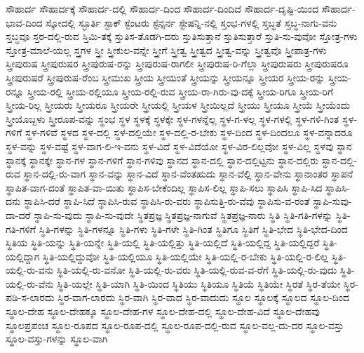 {ಸೌಹಾರ್ದ
ಸೌಹಾರ್ದಕ್ಕೆ
ಸೌಹಾರ್ದ-ದಲ್ಲಿ
ಸೌಹಾರ್ದ-ದಿಂದ
ಸೌಹಾರ್ದ-ದಿಂದಿದೆ
ಸೌಹಾರ್ದ-ದೃಷ್ಟಿ-ಯಿಂದ
ಸೌಹಾರ್ದ-ಭಾವ-ದಿಂದ
ಸ್ಕೋದಲ್ಲಿ
ಸ್ಛೂರ್ತಿ
ಸ್ಟಾಕ್
ಸ್ಟೆಂಟರು
ಸ್ಟೆನ್ಸರ್ನ
ಸ್ಟೇಷನ್ನಿ-ನಲ್ಲಿ
ಸ್ತಂಭ-ಗಳಲ್ಲಿ
ಸ್ತಬ್ಧತೆ
ಸ್ತಬ್ಧ-ನಾಗು-ವನು
ಸ್ತಬ್ಧವೂ
ಸ್ತರ-ದಲ್ಲಿ-ರುವ
ಸ್ತಿಮಿ-ತಕ್ಕೆ
ಸ್ತುತಿಸ-ತೊಡಗಿ-ದರು
ಸ್ತುತಿಸುತ್ತಾನೆ
ಸ್ತುತಿಸುತ್ತಾರೆ
ಸ್ತುತಿ-ಸು-ವುವೋ
ಸ್ತೋತ್ರ-ಗಳು
ಸ್ತೋತ್ರ-ಮಾಲೆ-ಯಲ್ಲ
ಸ್ತ್ರಗಳ
ಸ್ತ್ರೀ
ಸ್ತ್ರೀಕುಲ-ವನ್ನೇ
ಸ್ತ್ರೀಗೆ
ಸ್ತ್ರೀತ್ವ
ಸ್ತ್ರೀತ್ವದ
ಸ್ತ್ರೀತ್ವ-ವನ್ನು
ಸ್ತ್ರೀತ್ವವೊ
ಸ್ತ್ರೀಪಾತ್ರ-ಗಳು
ಸ್ತ್ರೀಪುರುಷ
ಸ್ತ್ರೀಪುರುಷರ
ಸ್ತ್ರೀಪುರುಷ-ರನ್ನು
ಸ್ತ್ರೀಪುರುಷ-ರಾಗಲೀ
ಸ್ತ್ರೀಪುರುಷ-ರಿ-ಗೆಲ್ಲಾ
ಸ್ತ್ರೀಪುರುಷರು
ಸ್ತ್ರೀಪುರುಷರೂ
ಸ್ತ್ರೀಪುರುಷರೆ
ಸ್ತ್ರೀಪುರುಷ-ರೆಂಬ
ಸ್ತ್ರೀಮುಖ
ಸ್ತ್ರೀಯ
ಸ್ತ್ರೀಯಂತೆ
ಸ್ತ್ರೀಯನ್ನು
ಸ್ತ್ರೀಯನ್ನೂ
ಸ್ತ್ರೀಯರ
ಸ್ತ್ರೀಯ-ರನ್ನು
ಸ್ತ್ರೀಯ-ರನ್ನೂ
ಸ್ತ್ರೀಯ-ರಲ್ಲಿ
ಸ್ತ್ರೀಯ-ರಲ್ಲಿಯೂ
ಸ್ತ್ರೀಯ-ರಲ್ಲಿ-ರುವ
ಸ್ತ್ರೀಯ-ರಾ-ಗಿರು-ವು-ದಕ್ಕೆ
ಸ್ತ್ರೀಯ-ರಿಗೂ
ಸ್ತ್ರೀಯ-ರಿಗೆ
ಸ್ತ್ರೀಯ-ರಿಲ್ಲ
ಸ್ತ್ರೀಯರು
ಸ್ತ್ರೀಯರೂ
ಸ್ತ್ರೀಯರೇ
ಸ್ತ್ರೀಯಲ್ಲಿ
ಸ್ತ್ರೀಯಳ
ಸ್ತ್ರೀಯಿಲ್ಲದೆ
ಸ್ತ್ರೀಯು
ಸ್ತ್ರೀಯೂ
ಸ್ತ್ರೀಯೆ
ಸ್ತ್ರೀಯೆಂದು
ಸ್ತ್ರೀಯೊಬ್ಬಳು
ಸ್ತ್ರೀರೂಪ-ವನ್ನು
ಸ್ಥಂಭ
ಸ್ಥಳ
ಸ್ಥಳಕ್ಕೆ
ಸ್ಥಳಕ್ಕೇ
ಸ್ಥಳ-ಗಳನ್ನೆಲ್ಲ
ಸ್ಥಳ-ಗ-ಳಲ್ಲ
ಸ್ಥಳ-ಗಳಲ್ಲಿ
ಸ್ಥಳ-ಗಳಿ-ಗಿಂತ
ಸ್ಥಳ-ಗಳಿಗೆ
ಸ್ಥಳ-ಗಳಿವೆ
ಸ್ಥಳದ
ಸ್ಥಳ-ದಲ್ಲಿ
ಸ್ಥಳ-ದಲ್ಲಿಯೇ
ಸ್ಥಳ-ದಲ್ಲಿ-ರ-ಬೇಕು
ಸ್ಥಳ-ದಿಂದ
ಸ್ಥಳ-ದಿಂದಲೂ
ಸ್ಥಳ-ವನ್ನಾದರೂ
ಸ್ಥಳ-ವನ್ನು
ಸ್ಥಳ-ವಷ್ಟೆ
ಸ್ಥಳ-ವಾಗ-ಲಿ-ಇ-ವನು
ಸ್ಥಳ-ವಿದೆ
ಸ್ಥಳ-ವಿದೆಯೋ
ಸ್ಥಳ-ವಿರ-ಲಿಲ್ಲವೋ
ಸ್ಥಳ-ವಿಲ್ಲ
ಸ್ಥಳವು
ಸ್ಥಾನ
ಸ್ಥಾನಕ್ಕೆ
ಸ್ಥಾನಕ್ಕೇ
ಸ್ಥಾನ-ಗಳ
ಸ್ಥಾನ-ಗಳಿಗೆ
ಸ್ಥಾನ-ಗಳಿವು
ಸ್ಥಾನದ
ಸ್ಥಾನ-ದಲ್ಲಿ
ಸ್ಥಾನ-ದಲ್ಲಿಟ್ಟನು
ಸ್ಥಾನ-ದಲ್ಲಿರು
ಸ್ಥಾನ-ದಲ್ಲಿ-ರುವ
ಸ್ಥಾನ-ದಲ್ಲಿ-ರು-ವಾಗ
ಸ್ಥಾನ-ವನ್ನು
ಸ್ಥಾನ-ವಿದೆ
ಸ್ಥಾನ-ವೆಂತಹುದು
ಸ್ಥಾನ-ವೆಲ್ಲಿ
ಸ್ಥಾನ-ವೇನು
ಸ್ಥಾನಾಂತರ
ಸ್ಥಾಪನೆ
ಸ್ಥಾಪಿತ-ವಾಗ-ದಂತೆ
ಸ್ಥಾಪಿತ-ವಾ-ಯಿತು
ಸ್ಥಾಪಿಸ-ಬೇಕೆಂದಿಲ್ಲ
ಸ್ಥಾಪಿಸ-ಲಿಲ್ಲ
ಸ್ಥಾಪಿ-ಸಲು
ಸ್ಥಾಪಿಸಿ
ಸ್ಥಾಪಿ-ಸಿದ
ಸ್ಥಾಪಿಸಿ-ದನು
ಸ್ಥಾಪಿಸಿ-ದರೆ
ಸ್ಥಾಪಿ-ಸಿದೆ
ಸ್ಥಾಪಿಸಿ-ರುವ
ಸ್ಥಾಪಿಸಿ-ರು-ವರು
ಸ್ಥಾಪಿಸುತ್ತಿ-ರು-ವೆವು
ಸ್ಥಾಪಿಸು-ವ-ರಂತೆ
ಸ್ಥಾಪಿ-ಸುವು-ದಾ-ದರೆ
ಸ್ಥಾಪಿ-ಸು-ವುದು
ಸ್ಥಾಪಿ-ಸು-ವುದೇ
ಸ್ಥಿತಪ್ರಜ್ಞ
ಸ್ಥಿತಪ್ರಜ್ಞ-ನಾಗುವೆ
ಸ್ಥಿತಪ್ರಜ್ಞ-ನಾರು
ಸ್ಥಿತಿ
ಸ್ಥಿತಿ-ಗತಿ-ಗಳನ್ನು
ಸ್ಥಿತಿ-ಗತಿ-ಗಳಿಗೆ
ಸ್ಥಿತಿ-ಗಳನ್ನು
ಸ್ಥಿತಿ-ಗಳನ್ನೂ
ಸ್ಥಿತಿ-ಗಳು
ಸ್ಥಿತಿ-ಗಳೇ
ಸ್ಥಿತಿ-ಗಿಂತ
ಸ್ಥಿತಿಗೂ
ಸ್ಥಿತಿಗೆ
ಸ್ಥಿತಿ-ಭೇದ
ಸ್ಥಿತಿ-ಭೇದ-ದಿಂದ
ಸ್ಥಿತಿಯ
ಸ್ಥಿತಿ-ಯನ್ನು
ಸ್ಥಿತಿ-ಯನ್ನೇ
ಸ್ಥಿತಿ-ಯಲ್ಲಿ
ಸ್ಥಿತಿ-ಯಲ್ಲಿತ್ತು
ಸ್ಥಿತಿ-ಯಲ್ಲಿದೆ
ಸ್ಥಿತಿ-ಯಲ್ಲಿದ್ದ
ಸ್ಥಿತಿ-ಯಲ್ಲಿದ್ದರೆ
ಸ್ಥಿತಿ-ಯಲ್ಲಿದ್ದಾಗ
ಸ್ಥಿತಿ-ಯಲ್ಲಿದ್ದುವೋ
ಸ್ಥಿತಿ-ಯಲ್ಲಿಯೂ
ಸ್ಥಿತಿ-ಯಲ್ಲಿಯೇ
ಸ್ಥಿತಿ-ಯಲ್ಲಿ-ರ-ಬೇಕು
ಸ್ಥಿತಿ-ಯಲ್ಲಿ-ರ-ಲಿಲ್ಲ
ಸ್ಥಿತಿ-ಯಲ್ಲಿ-ರು-ವನು
ಸ್ಥಿತಿ-ಯಲ್ಲಿ-ರು-ವನೋ
ಸ್ಥಿತಿ-ಯಲ್ಲಿ-ರು-ವರು
ಸ್ಥಿತಿ-ಯಲ್ಲಿ-ರುವ-ವ-ರೆಗೆ
ಸ್ಥಿತಿ-ಯಲ್ಲಿ-ರು-ವುದು
ಸ್ಥಿತಿ-ಯಲ್ಲಿ-ರು-ವೆನು
ಸ್ಥಿತಿ-ಯಲ್ಲೇ
ಸ್ಥಿತಿ-ಯಾಗಿ
ಸ್ಥಿತಿ-ಯಿಂದ
ಸ್ಥಿತಿಯು
ಸ್ಥಿತಿಯೂ
ಸ್ಥಿತಿಯೆ
ಸ್ಥಿತಿಯೇ
ಸ್ಥಿರತೆ
ಸ್ಥಿರ-ತೆಯೇ
ಸ್ಥಿರ-ಪಡಿ-ಸ-ಲಾರದು
ಸ್ಥಿರ-ವಾಗ-ಲಾರದು
ಸ್ಥಿರ-ವಾಗಿ
ಸ್ಥಿರ-ವಾದ
ಸ್ಥಿರ-ವಾದುದು
ಸ್ಥೂಲ
ಸ್ಥೂಲಕ್ಕೆ
ಸ್ಥೂಲದ
ಸ್ಥೂಲ-ದಿಂದ
ಸ್ಥೂಲ-ದೇಹ
ಸ್ಥೂಲ-ದೇಹಕ್ಕೂ
ಸ್ಥೂಲ-ದೇಹ-ಗಳ
ಸ್ಥೂಲ-ದೇಹ-ದಲ್ಲಿ
ಸ್ಥೂಲ-ದೇಹ-ವಿದೆ
ಸ್ಥೂಲ-ದೇಹವು
ಸ್ಥೂಲಪ್ರಪಂಚ
ಸ್ಥೂಲ-ರೂಪದ
ಸ್ಥೂಲ-ರೂಪ-ದಲ್ಲಿ
ಸ್ಥೂಲ-ರೂಪ-ದಲ್ಲಿ-ರುವ
ಸ್ಥೂಲ-ವಲ್ಲ-ದು-ದರ
ಸ್ಥೂಲ-ವಸ್ತು
ಸ್ಥೂಲ-ವಸ್ತು-ಗಳನ್ನು
ಸ್ಥೂಲ-ವಾಗಿ
}
